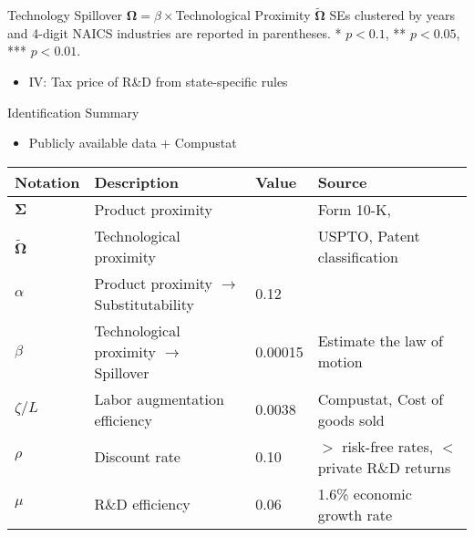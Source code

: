 \documentclass[
  10pt,               %
  aspectratio=169,     %
]{beamer}
\theoremstyle{plain}
\begin{document}
\begin{frame}{Technology Spillover $\bm{\Omega}=\beta\times$Technological Proximity $\bm{\widetilde{\Omega}}$}
{  SEs clustered by years and 4-digit NAICS industries are reported in parentheses.
    {*} $p<\text{0.1}$, {**} $p<\text{0.05}$, {***} $p<\text{0.01}$.}
  \begin{itemize}
    \item IV: Tax price of R\&D from state-specific rules \citep{Bloom2013-pn}

          \hyperlink{first_stage}{}
  \end{itemize}
\end{frame}

\begin{frame}{Identification Summary}
  \begin{itemize}
    \item Publicly available data + Compustat
  \end{itemize}
  \begin{table}[h]
    \centering
    \small
    \begin{tabular}{llll}
      \toprule
      Notation                  & Description                                      & Value   & Source                                        \\
      \midrule
      $\bm{\Sigma}$             & Product proximity                                &         & Form 10-K, \citet{Hoberg2016-jm}              \\
      $\bm{\widetilde{\Omega}}$ & Technological proximity                          &         & USPTO, Patent classification                  \\
      $\alpha$                  & Product proximity $\rightarrow$ Substitutability & 0.12    & \citet{Pellegrino2024-dn}                     \\
      $\beta$                   & Technological proximity $\rightarrow$ Spillover  & 0.00015 & Estimate the law of motion                    \\
      $\zeta/L$                 & Labor augmentation efficiency                    & 0.0038  & Compustat, Cost of goods sold                 \\
      $\rho$                    & Discount rate                                    & 0.10    & $>$ risk-free rates, $<$ private R\&D returns \\
      $\mu$                     & R\&D efficiency                                  & 0.06    & 1.6\% economic growth rate                    \\
      \bottomrule
    \end{tabular}
  \end{table}
\end{frame}
\end{document}

